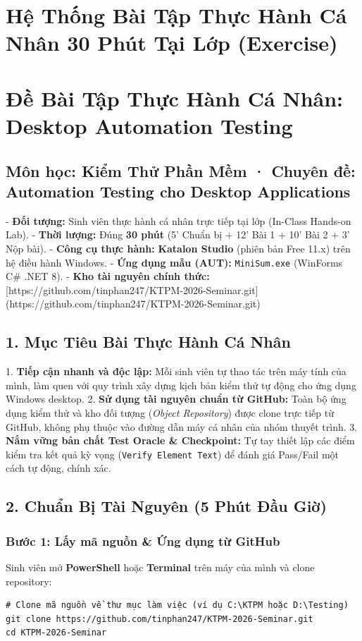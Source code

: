\section{Hệ Thống Bài Tập Thực Hành Cá Nhân 30 Phút Tại Lớp (Exercise)}

\section{Đề Bài Tập Thực Hành Cá Nhân: Desktop Automation Testing}
\subsection{Môn học: Kiểm Thử Phần Mềm · Chuyên đề: Automation Testing cho Desktop Applications}

- \textbf{Đối tượng:} Sinh viên thực hành cá nhân trực tiếp tại lớp (In-Class Hands-on Lab).
- \textbf{Thời lượng:} Đúng \textbf{30 phút} (5' Chuẩn bị + 12' Bài 1 + 10' Bài 2 + 3' Nộp bài).
- \textbf{Công cụ thực hành:} \textbf{Katalon Studio} (phiên bản Free 11.x) trên hệ điều hành Windows.
- \textbf{Ứng dụng mẫu (AUT):} \texttt{MiniSum.exe} (WinForms C# .NET 8).
- \textbf{Kho tài nguyên chính thức:} [https://github.com/tinphan247/KTPM-2026-Seminar.git](https://github.com/tinphan247/KTPM-2026-Seminar.git)


\subsection{1. Mục Tiêu Bài Thực Hành Cá Nhân}

1. \textbf{Tiếp cận nhanh và độc lập:} Mỗi sinh viên tự thao tác trên máy tính của mình, làm quen với quy trình xây dựng kịch bản kiểm thử tự động cho ứng dụng Windows desktop.
2. \textbf{Sử dụng tài nguyên chuẩn từ GitHub:} Toàn bộ ứng dụng kiểm thử và kho đối tượng (\textit{Object Repository}) được clone trực tiếp từ GitHub, không phụ thuộc vào đường dẫn máy cá nhân của nhóm thuyết trình.
3. \textbf{Nắm vững bản chất Test Oracle & Checkpoint:} Tự tay thiết lập các điểm kiểm tra kết quả kỳ vọng (\texttt{Verify Element Text}) để đánh giá Pass/Fail một cách tự động, chính xác.


\subsection{2. Chuẩn Bị Tài Nguyên (5 Phút Đầu Giờ)}

\subsubsection{Bước 1: Lấy mã nguồn \& Ứng dụng từ GitHub}
Sinh viên mở \textbf{PowerShell} hoặc \textbf{Terminal} trên máy của mình và clone repository:
\begin{lstlisting}
# Clone mã nguồn về thư mục làm việc (ví dụ C:\KTPM hoặc D:\Testing)
git clone https://github.com/tinphan247/KTPM-2026-Seminar.git
cd KTPM-2026-Seminar
\end{lstlisting}

